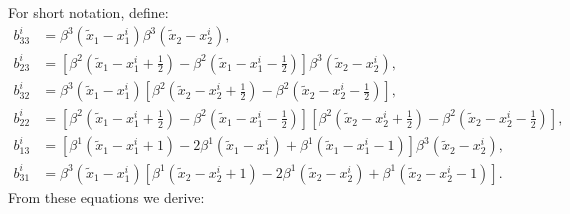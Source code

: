 \documentclass[]{article}
\begin{document}
For short notation, define:
\begin{align}
b_{33}^{i} &= \beta^3(\widetilde{x}_1 - x_{1}^i)
\beta^3(\widetilde{x}_2 - x_{2}^i), \\
b_{23}^{i} &= \left[ \beta^2(\widetilde{x}_1 - x_{1}^i +
\tfrac{1}{2} ) - \beta^2(\widetilde{x}_1 - x_{1}^i - \tfrac{1}{2} )
\right] \beta^3(\widetilde{x}_2 - x_{2}^i), \\
b_{32}^{i} &= \beta^3(\widetilde{x}_1 - x_{1}^i) \left[
\beta^2(\widetilde{x}_2 - x_{2}^i + \tfrac{1}{2} ) - \beta^2(
\widetilde{x}_2 - x_{2}^i - \tfrac{1}{2} ) \right], \\
b_{22}^{i} &= \left[ \beta^2( \widetilde{x}_1 - x_{1}^i +
\tfrac{1}{2} ) - \beta^2( \widetilde{x}_1 - x_{1}^i - \tfrac{1}{2} )
\right] \left[ \beta^2( \widetilde{x}_2 - x_{2}^i + \tfrac{1}{2} ) -
\beta^2( \widetilde{x}_2 - x_{2}^i - \tfrac{1}{2} ) \right], \\
b_{13}^{i} &= \left[ \beta^1(\widetilde{x}_1 - x_{1}^i + 1 ) - 2
\beta^1( \widetilde{x}_1 - x_{1}^i ) + \beta^1(\widetilde{x}_1 -
x_{1}^i - 1 ) \right] \beta^3(\widetilde{x}_2 - x_{2}^i), \\
b_{31}^{i} &= \beta^3(\widetilde{x}_1 - x_{1}^i) \left[
\beta^1(\widetilde{x}_2 - x_{2}^i + 1 ) - 2 \beta^1( \widetilde{x}_2
- x_{2}^i ) + \beta^1(\widetilde{x}_2 - x_{2}^i - 1 ) \right].
\end{align}
From these equations we derive:
\end{document}
